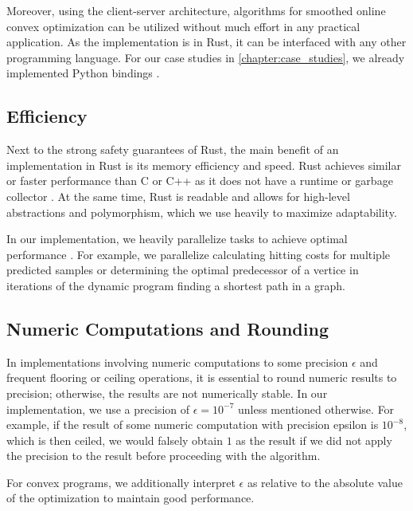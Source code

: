 Moreover, using the client-server architecture, algorithms for smoothed online convex optimization can be utilized without much effort in any practical application. As the implementation is in Rust, it can be interfaced with any other programming language. For our case studies in \autoref{chapter:case_studies}, we already implemented Python bindings \cite{Hübotter2021_3}.

\subsection{Efficiency}

Next to the strong safety guarantees of Rust, the main benefit of an implementation in Rust is its memory efficiency and speed. Rust achieves similar or faster performance than C or C++ as it does not have a runtime or garbage collector \cite{Rust, Perkel2020}. At the same time, Rust is readable and allows for high-level abstractions and polymorphism, which we use heavily to maximize adaptability.

In our implementation, we heavily parallelize tasks to achieve optimal performance \cite{Matsakis2015}. For example, we parallelize calculating hitting costs for multiple predicted samples or determining the optimal predecessor of a vertice in iterations of the dynamic program finding a shortest path in a graph.

\subsection{Numeric Computations and Rounding}

In implementations involving numeric computations to some precision $\epsilon$ and frequent flooring or ceiling operations, it is essential to round numeric results to precision; otherwise, the results are not numerically stable. In our implementation, we use a precision of $\epsilon = 10^{-7}$ unless mentioned otherwise. For example, if the result of some numeric computation with precision epsilon is $10^{-8}$, which is then ceiled, we would falsely obtain $1$ as the result if we did not apply the precision to the result before proceeding with the algorithm.

For convex programs, we additionally interpret $\epsilon$ as relative to the absolute value of the optimization to maintain good performance.

